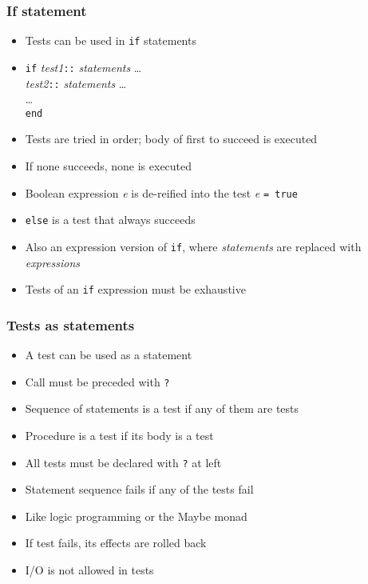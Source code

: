\documentclass[12pt]{beamer}
\begin{document}
\begin{frame}[fragile]
\frametitle{If statement}
\begin{itemize}
\item Tests can be used in \texttt{if} statements
\item \texttt{if} \emph{test1}\texttt{::} \emph{statements} \ldots \\
\hspace*{1em} \emph{test2}\texttt{::} \emph{statements} \ldots \\
\hspace*{1em} \ldots \\
\texttt{end}
\item Tests are tried in order; body of first to succeed is executed
\item If none succeeds, none is executed
\item Boolean expression \emph{e} is de-reified into the test \emph{e}
  \texttt{= true}
\item \texttt{else} is a test that always succeeds
\item Also an expression version of \texttt{if}, where
  \emph{statements} are replaced with \emph{expressions}
\item Tests of an \texttt{if} expression must be exhaustive
\end{itemize}
\end{frame}


\begin{frame}[fragile]
\frametitle{Tests as statements}
\begin{itemize}
\item A test can be used as a statement
\item Call must be preceded with \texttt{?}
\item Sequence of statements is a test if any of them are tests
\item Procedure is a test if its body is a test
\item All tests must be declared with \texttt{?} at left
\item Statement sequence fails if any of the tests fail
\item Like logic programming or the Maybe monad
\item If test fails, its effects are rolled back
\item I/O is not allowed in tests
\end{itemize}
\end{frame}
\end{document}
